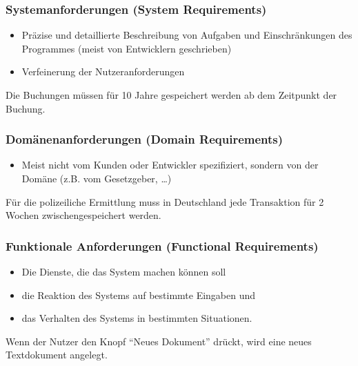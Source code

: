 \documentclass[
    ngerman,
    color=3b,
    summary,
    boxarc,
    main,
]{rubos-tuda-template}
\begin{document}
\subsubsection{Systemanforderungen (System Requirements)}\label{System Requirements}
\begin{itemize}
    \item Präzise und detaillierte Beschreibung von  Aufgaben und Einschränkungen des Programmes (meist von Entwicklern geschrieben)
    \item Verfeinerung der Nutzeranforderungen
\end{itemize}
 Die Buchungen müssen für 10 Jahre gespeichert werden ab dem Zeitpunkt der Buchung.
\subsubsection{Domänenanforderungen (Domain Requirements)}\label{Domain Requirements}
\begin{itemize}
    \item Meist nicht vom Kunden oder Entwickler spezifiziert, sondern von der Domäne (z.B. vom Gesetzgeber, \dots)
\end{itemize}
 Für die polizeiliche Ermittlung muss in Deutschland jede Transaktion für 2 Wochen zwischengespeichert werden.
\subsubsection{Funktionale Anforderungen (Functional Requirements)}\label{Functional Requirements}
\begin{itemize}
    \item Die Dienste, die das System machen können soll
    \item die Reaktion des Systems auf bestimmte Eingaben und
    \item das Verhalten des Systems in bestimmten Situationen.
\end{itemize}
 Wenn der Nutzer den Knopf "`Neues Dokument"' drückt, wird eine neues Textdokument angelegt.
\end{document}
